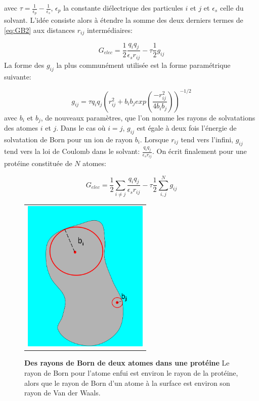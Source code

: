 avec $ \tau = \frac{1}{\epsilon_p} - \frac{1}{\epsilon_s}$, $\epsilon_p$ la constante diélectrique des particules $i$ et $j$ et $\epsilon_s$ celle du solvant. L'idée consiste alors à étendre la somme des deux derniers termes de \ref{eq:GB2} aux distances $r_{ij}$ intermédiaires:

\begin{equation}
  G_{elec} = \frac{1}{2} \frac{q_iq_j}{\epsilon_s r_{ij}} - \tau \frac{1}{2} g_{ij}
\end{equation}
La forme des $g_{ij}$ la plus communément utilisée est la forme paramétrique suivante:


\begin{equation}
  \label{eq:GBg}
  g_{ij}= \tau q_iq_j (r^2_{ij} + b_ib_j exp(\frac{-r^2_{ij}}{4b_ib_j}))^{-1/2} 
\end{equation}
avec $b_i$ et $b_j$, de nouveaux paramètres, que l'on nomme les rayons de solvatations des atomes $i$ et $j$. Dans le cas où $i=j$, $g_{ij}$ est égale à deux fois l'énergie de solvatation de Born pour un ion de rayon $b_i$. Lorsque $r_{ij}$ tend vers l'infini, $g_{ij}$ tend vers la loi de Coulomb dans le solvant: $\frac{q_iq_j}{\epsilon_s r_{ij}}$. On écrit finalement pour une protéine constituée de $N$ atomes:

\begin{equation}
  G_{elec} = \frac{1}{2} \sum_{i \neq j} \frac{q_iq_j}{\epsilon_sr_{ij}} - \tau \frac{1}{2} \sum_{i,j}^N g_{ij}
\end{equation}


   \begin{figure}[!htbp]
     \centering
     \begin{tabular}{c}
       \includegraphics[width=6cm]{figure/rayon_Born.png} &
     \end{tabular}
     
     \caption{\textbf{Des rayons de Born de deux atomes dans une protéine} Le rayon de Born pour l'atome enfui est environ le rayon de la protéine, alors que le rayon de Born d'un atome à la surface est environ son rayon de Van der Waals.} 
\label{graph:rayonBorn}
   \end{figure}

